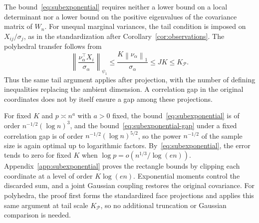\documentclass[11pt,letterpaper]{article}
\theoremstyle{remark}
\newcommand{\norm}[1]{\left\lVert#1\right\rVert}
\begin{document}
The bound~\eqref{eq:subexponential} requires neither a lower bound on a
local determinant nor a lower bound on the positive eigenvalues of the
covariance matrix of \(W_n\). For unequal marginal variances, the tail
condition is imposed on \(X_{ij}/\sigma_j\), as in the standardization after
Corollary~\ref{cor:observations}. The polyhedral transfer follows from
\[
 \left\|\frac{\nu_\alpha^\top X_i}{\sigma_\alpha}\right\|_{\psi_1}
 \le \frac{K\norm{\nu_\alpha}_1}{\sigma_\alpha}
 \le JK\le K_{\mathcal P}.
\]
Thus the same tail argument applies after projection, with the number
of defining inequalities replacing the ambient dimension. A correlation
gap in the original coordinates does not by itself ensure a gap among
these projections.

For fixed \(K\) and \(p\asymp n^a\) with \(a>0\) fixed, the
bound~\eqref{eq:subexponential} is of order \(n^{-1/2}(\log n)^3\), and the
bound~\eqref{eq:subexponential-gap} under a fixed correlation gap is of order
\(n^{-1/2}(\log n)^{5/2}\), so the power \(n^{-1/2}\) of the sample size is
again optimal up to logarithmic factors. By~\eqref{eq:subexponential}, the error
tends to zero for fixed \(K\) when \(\log p=o(n^{1/3}/\log(en))\).
Appendix~\ref{app:subexponential} proves the rectangle bounds by
clipping each coordinate at a level of order \(K\log(en)\).
Exponential moments control the discarded sum, and a joint Gaussian
coupling restores the original covariance. For polyhedra, the proof
first forms the standardized face projections and applies this same
argument at tail scale \(K_{\mathcal P}\), so no additional truncation
or Gaussian comparison is needed.
\end{document}
